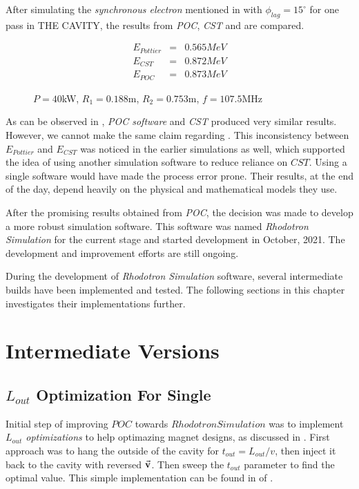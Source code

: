 \documentclass[a4paper,oneside,12pt]{report}
\numberwithin{equation}{chapter}
\begin{document}
After simulating the \textit{synchronous electron} mentioned in  with $\phi_{lag}=15^\circ$ for one pass in THE CAVITY, the results from \textit{POC}, \textit{CST} and  are compared.
\begin{figure}[H]
    \begin{eqnarray}
        E_{Pottier} &=& 0.565 MeV \nonumber\\
        E_{CST} &=& 0.872 MeV  \label{eq:poc_E_results}\\
        E_{POC} &=& 0.873 MeV \nonumber
    \end{eqnarray}
    \caption*{$P=40$kW, $R_1=0.188$m, $R_2=0.753$m, $f=107.5$MHz}
\end{figure}


As can be observed in , \textit{POC software} and \textit{CST} produced very similar results. However, we cannot make the same claim regarding .
This inconsistency between $E_{Pottier}$ and $E_{CST}$ was noticed in the earlier simulations as well, which supported the idea of using another simulation software to reduce reliance on $CST$.
Using a single software would have made the process error prone. Their results, at the end of the day, depend heavily on the physical and mathematical models they use.

After the promising results obtained from \textit{POC}, the decision was made to develop a more robust simulation software. This software was named \textit{Rhodotron Simulation} for the current stage and started development in October, 2021.
The development and improvement efforts are still ongoing. 

During the development of \textit{Rhodotron Simulation} software, several intermediate builds have been implemented and tested. The following sections in this chapter investigates their implementations further.



\newpage


\section{Intermediate Versions}

\subsection{$L_{out}$ Optimization For Single \e}
Initial step of improving $POC$ towards $Rhodotron Simulation$ was to implement \textit{$L_{out}$ optimizations} to help optimazing magnet designs, as discussed in .
First approach was to hang the \e outside of the cavity for $t_{out} = L_{out}/v$, then inject it back to the cavity with reversed $\vec{\textbf{v}}$. Then sweep the $t_{out}$ parameter to find the optimal value.
This simple implementation can be found in  of .
\end{document}
